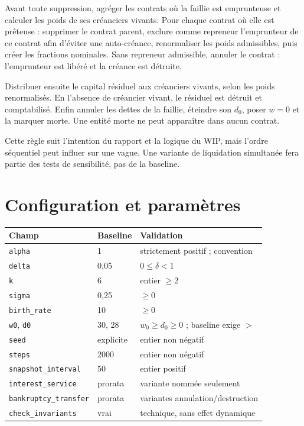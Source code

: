 \documentclass[11pt,a4paper]{article}
\newcommand{\code}[1]{\texttt{#1}}
\begin{document}
Avant toute suppression, agréger les contrats où la faillie est emprunteuse et
calculer les poids de ses créanciers vivants. Pour chaque contrat où elle est
prêteuse : supprimer le contrat parent, exclure comme repreneur l'emprunteur de
ce contrat afin d'éviter une auto-créance, renormaliser les poids admissibles,
puis créer les fractions nominales. Sans repreneur admissible, annuler le
contrat : l'emprunteur est libéré et la créance est détruite.

Distribuer ensuite le capital résiduel aux créanciers vivants, selon les poids
renormalisés. En l'absence de créancier vivant, le résiduel est détruit et
comptabilisé. Enfin annuler les dettes de la faillie, éteindre son $d_0$, poser
$w=0$ et la marquer morte. Une entité morte ne peut apparaître dans aucun contrat.

Cette règle suit l'intention du rapport et la logique du WIP, mais l'ordre
séquentiel peut influer sur une vague. Une variante de liquidation simultanée
fera partie des tests de sensibilité, pas de la baseline.

\section{Configuration et paramètres}

\begin{longtable}{p{}p{}p{}}
\toprule
Champ & Baseline & Validation \\
\midrule
\endhead
\code{alpha} & 1 & strictement positif ; convention \\
\code{delta} & 0,05 & $0\leq\delta<1$ \\
\code{k} & 6 & entier $\geq2$ \\
\code{sigma} & 0,25 & $\geq0$ \\
\code{birth\_rate} & 10 & $\geq0$ \\
\code{w0}, \code{d0} & 30, 28 & $w_0\geq d_0\geq0$ ; baseline exige $>$ \\
\code{seed} & explicite & entier non négatif \\
\code{steps} & 2000 & entier non négatif \\
\code{snapshot\_interval} & 50 & entier positif \\
\code{interest\_service} & prorata & variante nommée seulement \\
\code{bankruptcy\_transfer} & prorata & variantes annulation/destruction \\
\code{check\_invariants} & vrai & technique, sans effet dynamique \\
\bottomrule
\end{longtable}
\end{document}
